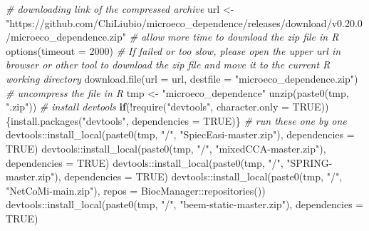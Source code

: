 \documentclass[
]{book}
\newenvironment{Shaded}{\begin{snugshade}}{\end{snugshade}}
\newcommand{\AttributeTok}[1]{\textcolor[rgb]{0.77,0.63,0.00}{#1}}
\newcommand{\CommentTok}[1]{\textcolor[rgb]{0.56,0.35,0.01}{\textit{#1}}}
\newcommand{\ConstantTok}[1]{\textcolor[rgb]{0.00,0.00,0.00}{#1}}
\newcommand{\ControlFlowTok}[1]{\textcolor[rgb]{0.13,0.29,0.53}{\textbf{#1}}}
\newcommand{\DecValTok}[1]{\textcolor[rgb]{0.00,0.00,0.81}{#1}}
\newcommand{\FunctionTok}[1]{\textcolor[rgb]{0.00,0.00,0.00}{#1}}
\newcommand{\NormalTok}[1]{#1}
\newcommand{\OtherTok}[1]{\textcolor[rgb]{0.56,0.35,0.01}{#1}}
\newcommand{\SpecialCharTok}[1]{\textcolor[rgb]{0.00,0.00,0.00}{#1}}
\newcommand{\StringTok}[1]{\textcolor[rgb]{0.31,0.60,0.02}{#1}}
\begin{document}
\begin{Shaded}
\begin{Highlighting}[]
\CommentTok{\# downloading link of the compressed archive}
\NormalTok{url }\OtherTok{\textless{}{-}} \StringTok{"https://github.com/ChiLiubio/microeco\_dependence/releases/download/v0.20.0/microeco\_dependence.zip"}
\CommentTok{\# allow more time to download the zip file in R}
\FunctionTok{options}\NormalTok{(}\AttributeTok{timeout =} \DecValTok{2000}\NormalTok{)}
\CommentTok{\# If failed or too slow, please open the upper url in browser or other tool to download the zip file and move it to the current R working directory}
\FunctionTok{download.file}\NormalTok{(}\AttributeTok{url =}\NormalTok{ url, }\AttributeTok{destfile =} \StringTok{"microeco\_dependence.zip"}\NormalTok{)}
\CommentTok{\# uncompress the file in R}
\NormalTok{tmp }\OtherTok{\textless{}{-}} \StringTok{"microeco\_dependence"}
\FunctionTok{unzip}\NormalTok{(}\FunctionTok{paste0}\NormalTok{(tmp, }\StringTok{".zip"}\NormalTok{))}
\CommentTok{\# install devtools}
\ControlFlowTok{if}\NormalTok{(}\SpecialCharTok{!}\FunctionTok{require}\NormalTok{(}\StringTok{"devtools"}\NormalTok{, }\AttributeTok{character.only =} \ConstantTok{TRUE}\NormalTok{))\{}\FunctionTok{install.packages}\NormalTok{(}\StringTok{"devtools"}\NormalTok{, }\AttributeTok{dependencies =} \ConstantTok{TRUE}\NormalTok{)\}}
\CommentTok{\# run these one by one}
\NormalTok{devtools}\SpecialCharTok{::}\FunctionTok{install\_local}\NormalTok{(}\FunctionTok{paste0}\NormalTok{(tmp, }\StringTok{"/"}\NormalTok{, }\StringTok{"SpiecEasi{-}master.zip"}\NormalTok{), }\AttributeTok{dependencies =} \ConstantTok{TRUE}\NormalTok{)}
\NormalTok{devtools}\SpecialCharTok{::}\FunctionTok{install\_local}\NormalTok{(}\FunctionTok{paste0}\NormalTok{(tmp, }\StringTok{"/"}\NormalTok{, }\StringTok{"mixedCCA{-}master.zip"}\NormalTok{), }\AttributeTok{dependencies =} \ConstantTok{TRUE}\NormalTok{)}
\NormalTok{devtools}\SpecialCharTok{::}\FunctionTok{install\_local}\NormalTok{(}\FunctionTok{paste0}\NormalTok{(tmp, }\StringTok{"/"}\NormalTok{, }\StringTok{"SPRING{-}master.zip"}\NormalTok{), }\AttributeTok{dependencies =} \ConstantTok{TRUE}\NormalTok{)}
\NormalTok{devtools}\SpecialCharTok{::}\FunctionTok{install\_local}\NormalTok{(}\FunctionTok{paste0}\NormalTok{(tmp, }\StringTok{"/"}\NormalTok{, }\StringTok{"NetCoMi{-}main.zip"}\NormalTok{), }\AttributeTok{repos =}\NormalTok{ BiocManager}\SpecialCharTok{::}\FunctionTok{repositories}\NormalTok{())}
\NormalTok{devtools}\SpecialCharTok{::}\FunctionTok{install\_local}\NormalTok{(}\FunctionTok{paste0}\NormalTok{(tmp, }\StringTok{"/"}\NormalTok{, }\StringTok{"beem{-}static{-}master.zip"}\NormalTok{), }\AttributeTok{dependencies =} \ConstantTok{TRUE}\NormalTok{)}

\end{Highlighting}
\end{Shaded}
\end{document}
